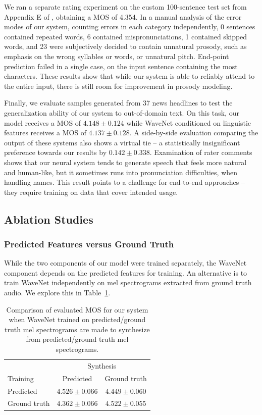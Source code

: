 We ran a separate rating experiment on the custom 100-sentence test set from
Appendix E of \cite{2017arXiv171007654P}, obtaining a MOS of 4.354.
In a manual analysis of the error modes of our system, counting errors in
each category independently, 0 sentences contained repeated words,
6 contained mispronunciations, 1 contained skipped words, and 23 were
subjectively decided to contain unnatural prosody, such as emphasis on the
wrong syllables or words, or unnatural pitch. End-point prediction failed in a
single case, on the input sentence containing the most characters.
These results show that while our system is able to reliably attend to the
entire input, there is still room for improvement in prosody modeling.

Finally, we evaluate samples generated from 37 news headlines to test the
generalization ability of our system to out-of-domain text. On this task, our
model receives a MOS of $4.148 \pm 0.124$ while WaveNet conditioned on
linguistic features receives a MOS of $4.137 \pm 0.128$.
A side-by-side evaluation comparing the output of these systems also
shows a virtual tie -- a statistically insignificant preference towards our
results by $0.142 \pm 0.338$. Examination of rater comments shows that our
neural system tends to generate speech that feels more natural and human-like,
but it sometimes runs into pronunciation difficulties, \eg when
handling names. This result points to a challenge for end-to-end
approaches -- they require training on data that cover intended usage.

\subsection{Ablation Studies}
\label{sec:ablation}

\subsubsection{Predicted Features versus Ground Truth}
\label{ssec:gtfeats}

While the two components of our model were trained separately, the WaveNet component
depends on the predicted features for training. An alternative
is to train WaveNet independently on mel spectrograms extracted from ground
truth audio. We explore this in Table~\ref{tbl:pred_gt}.

\begin{table}[H]
  \centering
  \begin{tabular}{lcc}
    \toprule
                 & \multicolumn{2}{c}{Synthesis}\\
    Training     & Predicted         & Ground truth \\
    \midrule
    Predicted    & $4.526 \pm 0.066$ & $4.449 \pm 0.060$ \\
    Ground truth & $4.362 \pm 0.066$ & $4.522 \pm 0.055$ \\
    \bottomrule
  \end{tabular}
\caption{Comparison of evaluated MOS for our system when WaveNet trained on
predicted/ground truth mel spectrograms are made to synthesize from
predicted/ground truth mel spectrograms.}
\label{tbl:pred_gt}
\end{table}

